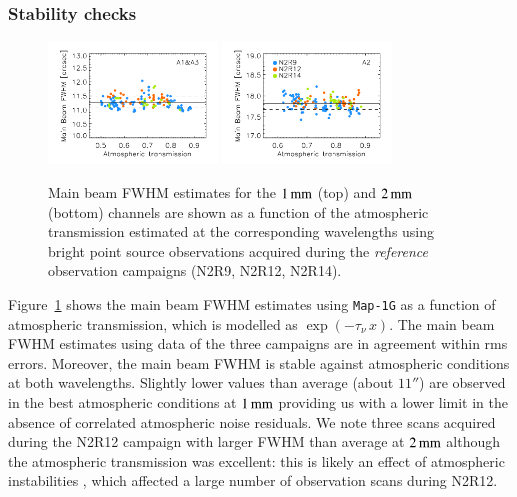 \documentclass[traditionalabstract]{aa}
\newcommand{\taunu}{\tau_{\nu}}
\begin{document}
\subsubsection{Stability checks}
\label{se:mainbeam_stability}

\begin{figure}[!thbp]
\begin{center}
  \includegraphics[clip, width=0.4\textwidth]{Figures/plot_FWHM_vs_atmtrans_mb_radius_binning2_1mm.pdf}
  \includegraphics[clip, width=0.4\textwidth]{Figures/plot_FWHM_vs_atmtrans_mb_radius_binning2_a2.pdf}
  \caption[Main Beam FWHM]{Main beam FWHM estimates for the
    $1\,\rm{mm}$ (top) and $2\,\rm{mm}$ (bottom) channels are shown as
    a function of the atmospheric transmission estimated at the
    corresponding wavelengths using bright point source observations
  acquired during the \emph{reference} observation campaigns (N2R9, N2R12, N2R14).}
\label{fig:fwhm_map_atmtrans}
\end{center}
\end{figure}

Figure~\ref{fig:fwhm_map_atmtrans} shows the main beam FWHM estimates
using {\tt Map-1G} as a function of atmospheric transmission,
which is modelled as $\exp{\left(-\taunu \, x\right)}$. 
The main beam FWHM estimates using data of the three campaigns are in
agreement within rms errors. Moreover, the main beam FWHM is stable
against atmospheric conditions at both wavelengths. Slightly lower
values than average (about $11''$) are observed in the best
atmospheric conditions at $1\,\rm{mm}$ providing us with a lower limit
in the absence of correlated atmospheric noise residuals. We note
three scans acquired during the N2R12 campaign with larger FWHM than average at
$2\,\rm{mm}$ although the atmospheric transmission was excellent: this
is likely an effect of atmospheric instabilities%
, which affected a large number of observation scans during N2R12. 
\end{document}

